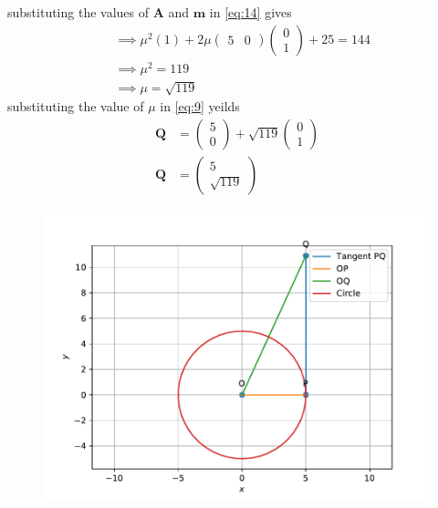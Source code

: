 \documentclass[12pt]{article}
\newcommand{\myvec}[1]{\ensuremath{\begin{pmatrix}#1\end{pmatrix}}}
\let\vec\mathbf
\begin{document}
\begin{enumerate}
		substituting the values of $\vec{A}$ and $\vec{m}$ in \eqref{eq:14} gives
\begin{align}
	&\implies\mu^2(1)+2\mu\myvec{5&0}\myvec{0\\1}+25=144\\
	&\implies\mu^2=119\\
	&\implies\mu=\sqrt{119}
\end{align}
		substituting the value of $\mu$ in \eqref{eq:9} yeilds 
\begin{align}
	\vec{Q}&=\myvec{5\\0}+\sqrt{119}\myvec{0\\1}\\
	\vec{Q}&=\myvec{5\\\sqrt{119}}
\end{align}
\begin{figure}[!h]
\begin{center}
\includegraphics[width=\columnwidth]{figs/fig2.pdf}
\end{center}
\caption{}
\label{fig:Fig1}
\end{figure}
\end{enumerate}
\end{document}
